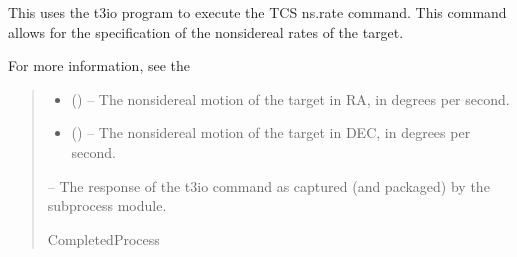 \documentclass[letterpaper,11pt,english]{sphinxmanual}
\begin{document}

\begin{savenotes}\begin{fulllineitems}
\label{\detokenize{code/opihiexarata.library.tcs:opihiexarata.library.tcs.t3io_tcs_ns_rate}}
\pysigstartsignatures
{}
\pysigstopsignatures
\sphinxAtStartPar
This uses the t3io program to execute the TCS ns.rate command.
This command allows for the specification of the non\sphinxhyphen{}sidereal rates of the
target.

\sphinxAtStartPar
For more information, see the
%
\begin{footnote}[104]\sphinxAtStartFootnote
{}
%
\end{footnote}
\begin{quote}\begin{description}
\begin{itemize}
\item {} 
\sphinxAtStartPar
{} () – The non\sphinxhyphen{}sidereal motion of the target in RA, in degrees per second.

\item {} 
\sphinxAtStartPar
{} () – The non\sphinxhyphen{}sidereal motion of the target in DEC, in degrees per second.

\end{itemize}

\sphinxAtStartPar
{} – The response of the t3io command as captured (and packaged) by
the subprocess module.

\sphinxAtStartPar
CompletedProcess

\end{description}\end{quote}

\end{fulllineitems}\end{savenotes}
\end{document}
